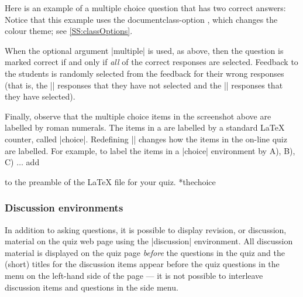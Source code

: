 \documentclass[svgnames]{article}
\makeatletter
\newcommand\macroIndex[1]{%
  \lowercase{\def\temp{#1}}%
  \expandafter\index\expandafter{\temp@\textbackslash#1}%
}
\makeatother
\begin{document}
  Here is an example of a multiple choice question that has
  two correct answers:
    \label{choice-multiple}
  Notice that this example uses the documentclass-option
  , which changes the \WebQuiz colour theme;
  see \autoref{SS:classOptions}.

  When the optional argument \LatexCode|multiple| is used, as above,
  then the question is marked correct if and only if \textit{all} of the
  correct responses are selected. Feedback to the students is randomly
  selected from the feedback for their wrong responses (that is, the
  \LatexCode|\correct| responses that they have not selected and the
  \LatexCode|\incorrect| responses that they have selected).

  Finally, observe that the multiple choice items in the screenshot
  above are labelled by roman numerals. The items in a
   are labelled by a standard \LaTeX{} counter, called
  \LatexCode|choice|. Redefining \LatexCode|\thechoice| changes how the
  items in the on-line quiz are labelled. For example, to label the
  items in a \LatexCode|choice| environment by A), B), C) $\dots$ add
  \begin{latexcode}
    \renewcommand\thechoice{\Alph{choice})}
  \end{latexcode}
  to the preamble of the \LaTeX{} file for your quiz.
  *{thechoice}\macroIndex{thechoice}

  \subsubsection{Discussion environments}\label{SS:discussion}

  In addition to asking questions, it is possible to display revision,
  or discussion, material on the quiz web page using the
  \LatexCode|discussion| environment.  All discussion material is
  displayed on the quiz page \textit{before} the questions in the quiz
  and the (short) titles for the discussion items appear before the quiz
  questions in the menu on the left-hand side of the page --- it is
  not possible to interleave discussion items and questions in the side
  menu.
\end{document}

